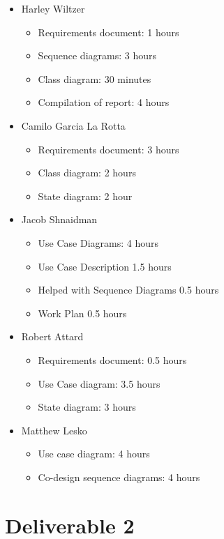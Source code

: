 \documentclass[12pt]{article}
\begin{document}
\begin{itemize}
    \item Harley Wiltzer
        \begin{itemize}
            \item Requirements document: 1 hours
            \item Sequence diagrams: 3 hours
            \item Class diagram: 30 minutes
            \item Compilation of report: 4 hours
        \end{itemize}
    \item Camilo Garcia La Rotta
    \begin{itemize}
        \item Requirements document: 3 hours
        \item Class diagram: 2 hours
        \item State diagram: 2 hour
    \end{itemize}
    \item Jacob Shnaidman
    \begin{itemize}
        \item Use Case Diagrams: 4 hours
        \item Use Case Description 1.5 hours
        \item Helped with Sequence Diagrams 0.5 hours
        \item Work Plan 0.5 hours
    \end{itemize}
    \item Robert Attard
    \begin{itemize}
        \item Requirements document: 0.5 hours
        \item Use Case diagram: 3.5 hours
        \item State diagram: 3 hours
    \end{itemize}
    \item Matthew Lesko
    \begin{itemize}
        \item Use case diagram: 4 hours
        \item Co-design sequence diagrams: 4 hours
    \end{itemize}
\end{itemize}

\newpage

\section{Deliverable 2}
\end{document}
